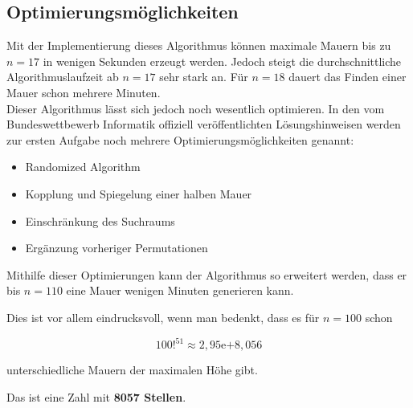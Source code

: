 \documentclass[a4paper,12pt]{article}
\begin{document}
\subsection{Optimierungsmöglichkeiten}
Mit der Implementierung dieses Algorithmus können maximale Mauern bis zu $n = 17$ in wenigen Sekunden erzeugt werden. Jedoch steigt die durchschnittliche Algorithmuslaufzeit ab $n = 17$ sehr stark an. Für $n = 18$ dauert das Finden einer Mauer schon mehrere Minuten.
\\[0.4cm]
Dieser Algorithmus lässt sich jedoch noch wesentlich optimieren. In den vom Bundeswettbewerb Informatik offiziell veröffentlichten Lösungshinweisen \cite{bwinf_loesungshinweise} werden zur ersten Aufgabe noch mehrere Optimierungsmöglichkeiten genannt:
\begin{itemize}
\item Randomized Algorithm
\item Kopplung und Spiegelung einer halben Mauer
\item Einschränkung des Suchraums
\item Ergänzung vorheriger Permutationen
\end{itemize}

Mithilfe dieser Optimierungen kann der Algorithmus so erweitert werden, dass er bis $n = 110$ eine Mauer wenigen Minuten generieren kann.

Dies ist vor allem eindrucksvoll, wenn man bedenkt, dass es für $n = 100$ schon
\begin{center}
\begin{Large}
\[100!^{51} \approx 2,95\mathrm{e}{+8,056}\]
\end{Large}
\end{center}
unterschiedliche Mauern der maximalen Höhe gibt.

Das ist eine Zahl mit \textbf{8057 Stellen}.
\end{document}
